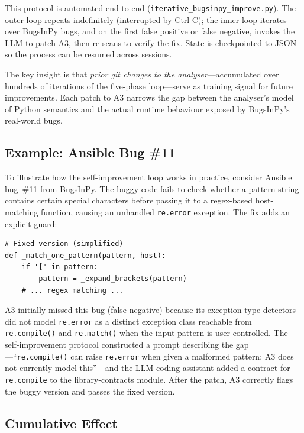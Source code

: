 \documentclass[sigconf,review,anonymous]{acmart}
\begin{document}
This protocol is automated end-to-end (\texttt{iterative\_bugsinpy\_improve.py}).
The outer loop repeats indefinitely (interrupted by Ctrl-C); the inner loop iterates over BugsInPy bugs, and on the first false positive or false negative, invokes the LLM to patch \textsc{A3}, then re-scans to verify the fix.
State is checkpointed to JSON so the process can be resumed across sessions.

The key insight is that \emph{prior git changes to the analyser}---accumulated over hundreds of iterations of the five-phase loop---serve as training signal for future improvements.
Each patch to \textsc{A3} narrows the gap between the analyser's model of Python semantics and the actual runtime behaviour exposed by BugsInPy's real-world bugs.

\subsection{Example: Ansible Bug \#11}

To illustrate how the self-improvement loop works in practice, consider Ansible bug~\#11 from BugsInPy.
The buggy code fails to check whether a pattern string contains certain special characters before passing it to a regex-based host-matching function, causing an unhandled \texttt{re.error} exception.
The fix adds an explicit guard:

\begin{lstlisting}
# Fixed version (simplified)
def _match_one_pattern(pattern, host):
    if '[' in pattern:
        pattern = _expand_brackets(pattern)
    # ... regex matching ...
\end{lstlisting}

\textsc{A3} initially missed this bug (false negative) because its exception-type detectors did not model \texttt{re.error} as a distinct exception class reachable from \texttt{re.compile()} and \texttt{re.match()} when the input pattern is user-controlled.
The self-improvement protocol constructed a prompt describing the gap---``\texttt{re.compile()} can raise \texttt{re.error} when given a malformed pattern; \textsc{A3} does not currently model this''---and the LLM coding assistant added a contract for \texttt{re.compile} to the library-contracts module.
After the patch, \textsc{A3} correctly flags the buggy version and passes the fixed version.

\subsection{Cumulative Effect}
\end{document}
